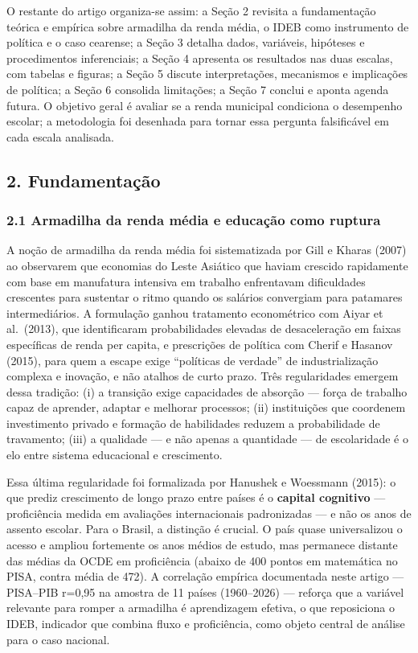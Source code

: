 \documentclass[
  brazilian,
  12pt,
  a4paper,
]{article}
\begin{document}
O restante do artigo organiza-se assim: a Seção 2 revisita a
fundamentação teórica e empírica sobre armadilha da renda média, o IDEB
como instrumento de política e o caso cearense; a Seção 3 detalha dados,
variáveis, hipóteses e procedimentos inferenciais; a Seção 4 apresenta
os resultados nas duas escalas, com tabelas e figuras; a Seção 5 discute
interpretações, mecanismos e implicações de política; a Seção 6
consolida limitações; a Seção 7 conclui e aponta agenda futura. O
objetivo geral é avaliar se a renda municipal condiciona o desempenho
escolar; a metodologia foi desenhada para tornar essa pergunta
falsificável em cada escala analisada.

\subsection{2. Fundamentação}\label{fundamentauxe7uxe3o}

\subsubsection{2.1 Armadilha da renda média e educação como
ruptura}\label{armadilha-da-renda-muxe9dia-e-educauxe7uxe3o-como-ruptura}

A noção de armadilha da renda média foi sistematizada por Gill e Kharas
(2007) ao observarem que economias do Leste Asiático que haviam crescido
rapidamente com base em manufatura intensiva em trabalho enfrentavam
dificuldades crescentes para sustentar o ritmo quando os salários
convergiam para patamares intermediários. A formulação ganhou tratamento
econométrico com Aiyar et al.~(2013), que identificaram probabilidades
elevadas de desaceleração em faixas específicas de renda per capita, e
prescrições de política com Cherif e Hasanov (2015), para quem a escape
exige ``políticas de verdade'' de industrialização complexa e inovação,
e não atalhos de curto prazo. Três regularidades emergem dessa tradição:
(i) a transição exige capacidades de absorção --- força de trabalho
capaz de aprender, adaptar e melhorar processos; (ii) instituições que
coordenem investimento privado e formação de habilidades reduzem a
probabilidade de travamento; (iii) a qualidade --- e não apenas a
quantidade --- de escolaridade é o elo entre sistema educacional e
crescimento.

Essa última regularidade foi formalizada por Hanushek e Woessmann
(2015): o que prediz crescimento de longo prazo entre países é o
\textbf{capital cognitivo} --- proficiência medida em avaliações
internacionais padronizadas --- e não os anos de assento escolar. Para o
Brasil, a distinção é crucial. O país quase universalizou o acesso e
ampliou fortemente os anos médios de estudo, mas permanece distante das
médias da OCDE em proficiência (abaixo de 400 pontos em matemática no
PISA, contra média de 472). A correlação empírica documentada neste
artigo --- PISA--PIB r=0,95 na amostra de 11 países (1960--2026) ---
reforça que a variável relevante para romper a armadilha é aprendizagem
efetiva, o que reposiciona o IDEB, indicador que combina fluxo e
proficiência, como objeto central de análise para o caso nacional.
\end{document}
